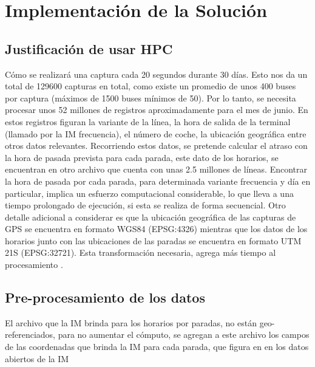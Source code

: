 \documentclass[journal]{IEEEtran}
\begin{document}



\section{Implementación de la Solución}
\subsection{Justificación de usar HPC}
Cómo se realizará una captura cada 20 segundos durante 30 días. Esto nos da un total de 129600 capturas en total, como existe un promedio de unos 400 buses por captura (máximos de 1500 buses mínimos de 50). Por lo tanto, se necesita procesar unos 52 millones de registros aproximadamente para el mes de junio.
En estos registros figuran la variante de la línea, la hora de salida de la terminal (llamado por la IM frecuencia), el número de coche, la ubicación geográfica entre otros datos relevantes. Recorriendo estos datos, se pretende calcular el atraso con la hora de pasada prevista para cada parada, este dato de  los horarios, se encuentran en otro archivo que cuenta con unas 2.5 millones de líneas. Encontrar la hora de pasada por cada parada, para determinada variante frecuencia y día en particular, implica un esfuerzo computacional considerable, lo que lleva a una tiempo prolongado de ejecución, si esta se realiza de forma secuencial. Otro detalle adicional a considerar es que la ubicación geográfica de las capturas de GPS se encuentra en formato WGS84 (EPSG:4326) mientras que los datos de los horarios junto con las ubicaciones de las paradas se encuentra en formato UTM 21S (EPSG:32721). Esta transformación necesaria, agrega más tiempo al procesamiento .

\subsection{Pre-procesamiento de los datos}
El archivo que la IM brinda para los horarios por paradas, no están geo-referenciados, para no aumentar el cómputo, se agregan a este archivo los campos de las coordenadas que brinda la IM para cada parada, que figura en en los datos abiertos de la IM \cite{paradas}
\end{document}
